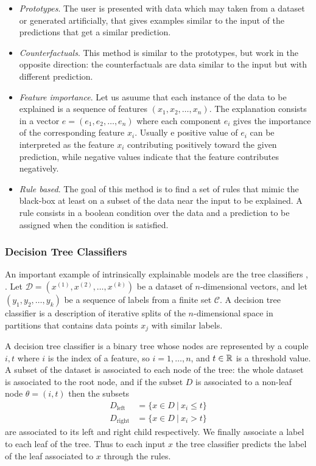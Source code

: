 \documentclass[]{marticle}
\newcommand{\ds}{\mathcal{D}}
\newcommand{\codes}{\mathcal{C}}
\begin{document}
\begin{itemize}

\item \textit{Prototypes}. The user is presented with data which may taken from a dataset or
    generated artificially, that gives examples similar to the input of the predictions that get a
    similar prediction.

\item \textit{Counterfactuals}. This method is similar to the prototypes, but work in the opposite
    direction: the counterfactuals are data similar to the input but with different prediction.

\item \textit{Feature importance}. Let us asuume that each instance of the data to be explained is a
    sequence of features $(x_1, x_2, \dots, x_n)$. The explanation consists in a vector $e=(e_1,
    e_2, \dots, e_n)$ where each component $e_i$ gives the importance of the corresponding feature
    $x_i$. Usually e positive value of $e_i$ can be interpreted as the feature $x_i$ contributing
    positively toward the given prediction, while negative values indicate that the feature
    contributes negatively.

\item \textit{Rule based}. The goal of this method is to find a set of rules that mimic the
    black-box at least on a subset of the data near the input to be explained. A rule consists in a
    boolean condition over the data and a prediction to be assigned when the condition is satisfied.

\end{itemize}

\subsubsection{Decision Tree Classifiers} \label{sec:trees}

An important example of intrinsically explainable models are the tree classifiers
\cite{tibsharani-elements}, \cite{trees-breiman}. Let $\ds=(x^{(1)}, x^{(2)}, \dots, x^{(k)})$ be a
dataset of $n$-dimensional vectors, and let $(y_1, y_2, \dots, y_k)$ be a sequence of labels from a
finite set $\codes$. A decision tree classifier is a description of iterative splits of the
$n$-dimensional space in partitions that contains data points $x_j$ with similar labels.

A decision tree classifier is a binary tree whose nodes are represented by a couple $i, t$ where $i$
is the index of a feature, so $i=1,\dots,n$, and $t\in\mathbb{R}$ is a threshold value. A subset of the
dataset is associated to each node of the tree: the whole dataset is associated to the root node,
and if the subset $D$ is associated to a non-leaf node $\theta = (i, t)$ then the subsets
\begin{align*}
    D_\text{left}  &= \{x \in D \ |\ x_i \leq t\} \\
    D_\text{right} &= \{x \in D \ |\ x_i >    t\}
\end{align*}
are associated to its left and right child respectively. We finally associate a label to each leaf
of the tree. Thus to each input $x$ the tree classifier predicts the label of the leaf associated to
$x$ through the rules.
\end{document}
